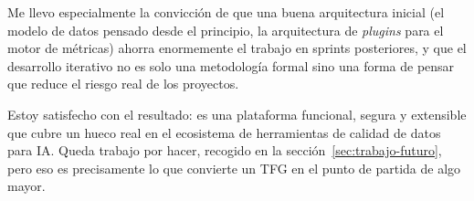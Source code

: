 Me llevo especialmente la convicción de que una buena arquitectura inicial
(el modelo de datos pensado desde el principio, la arquitectura de
\emph{plugins} para el motor de métricas) ahorra enormemente el trabajo en
sprints posteriores, y que el desarrollo iterativo no es solo una metodología
formal sino una forma de pensar que reduce el riesgo real de los proyectos.

Estoy satisfecho con el resultado: \dataqual es una plataforma funcional,
segura y extensible que cubre un hueco real en el ecosistema de herramientas
de calidad de datos para \ac{IA}.  Queda trabajo por hacer, recogido en
la sección~\ref{sec:trabajo-futuro}, pero eso es precisamente lo que
convierte un \ac{TFG} en el punto de partida de algo mayor.


